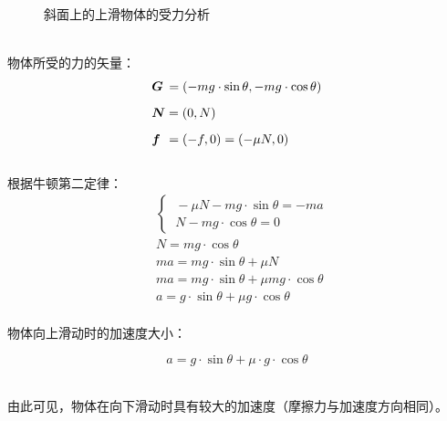 \documentclass[UTF8]{ctexart}
\newcommand*{\veb}[1]{\vb*{#1}}
\begin{document}
\begin{figure}[h]
\begin{center}
            \caption{斜面上的上滑物体的受力分析}
        \end{center}
    \end{figure}\\
    物体所受的力的矢量：
    \begin{align}
        &\veb{G}\hspace{2.0pt}=(-mg\cdot\sin{\theta},-mg\cdot\cos{\theta})\\[2mm]
        &\veb{N}=(0,N)\\[2mm]
        &\veb{f}\hspace{4.0pt}=(-f,0)=(-\mu N,0)
    \end{align}\\
    根据牛顿第二定律：
    \begin{align}
        &\begin{cases}
            ~-\mu N-mg\cdot\sin{\theta}=-ma\\[1mm]
            ~N-mg\cdot\cos{\theta}=0
        \end{cases}\\[2mm]
        &N=mg\cdot\cos{\theta}\\[2mm]
        &ma=mg\cdot\sin{\theta}+\mu N\\[2mm]
        &ma=mg\cdot\sin{\theta}+\mu mg\cdot\cos{\theta}\\[2mm]
        &a=g\cdot\sin{\theta}+\mu g\cdot\cos{\theta}
    \end{align}\\
    物体向上滑动时的加速度大小：
    \begin{large}
        \begin{equation*}
            a=g\cdot\sin{\theta}+\mu\cdot g\cdot\cos{\theta}
        \end{equation*}
    \end{large}\\
    由此可见，物体在向下滑动时具有较大的加速度（摩擦力与加速度方向相同）。
\end{document}
